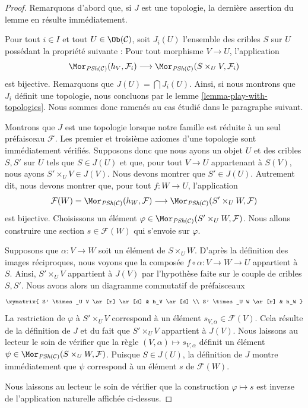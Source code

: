 \begin{proof}
Remarquons d'abord que, si $J$ est une topologie, la dernière assertion du
lemme en résulte immédiatement.

\medskip\noindent
Pour tout $i \in I$ et tout $U \in \Ob(\mathcal{C})$, soit $J_i(U)$
l'ensemble des cribles $S$ sur $U$ possédant la propriété suivante :
Pour tout morphisme $V \to U$, l'application
$$
\Mor_{\textit{PSh}(\mathcal{C})}(h_V, \mathcal{F}_i)
\longrightarrow
\Mor_{\textit{PSh}(\mathcal{C})}(S \times_U V, \mathcal{F}_i)
$$
est bijective. Remarquons que $J(U) = \bigcap J_i(U)$. Ainsi, si nous montrons
que $J_i$ définit une topologie, nous concluons par le
lemme \ref{lemma-play-with-topologies}.
Nous sommes donc ramenés au cas étudié dans le paragraphe suivant.

\medskip\noindent
Montrons que $J$ est une topologie lorsque notre famille est réduite à un seul
préfaisceau $\mathcal{F}$. Les premier et troisième axiomes d'une
topologie sont immédiatement vérifiés. Supposons donc que nous ayons
un objet $U$ et des cribles $S, S'$ sur $U$
tels que $S \in J(U)$ et que, pour tout $V \to U$ appartenant à $S(V)$,
nous ayons $S' \times_U V \in J(V)$. Nous devons montrer que
$S' \in J(U)$. Autrement dit, nous devons montrer que, pour
tout $f : W \to U$, l'application
$$
\mathcal{F}(W) =
\Mor_{\textit{PSh}(\mathcal{C})}(h_W, \mathcal{F})
\longrightarrow
\Mor_{\textit{PSh}(\mathcal{C})}(S' \times_U W, \mathcal{F})
$$
est bijective. Choisissons un élément $\varphi \in
\Mor_{\textit{PSh}(\mathcal{C})}(S' \times_U W, \mathcal{F})$.
Nous allons construire une section $s \in \mathcal{F}(W)$
qui s'envoie sur $\varphi$.

\medskip\noindent
Supposons que $\alpha : V \to W$ soit un élément de $S \times_U W$.
D'après la définition des images réciproques, nous voyons que
la composée $f \circ \alpha : V \to W  \to U$ appartient à $S$. Ainsi,
$S' \times_U V$ appartient à $J(V)$ par l'hypothèse faite sur le couple
de cribles $S, S'$. Nous avons alors un diagramme commutatif
de préfaisceaux
$$
\xymatrix{
S' \times_U V \ar[r] \ar[d] & h_V \ar[d] \\
S' \times_U W \ar[r] & h_W
}
$$
La restriction de $\varphi$ à $S' \times_U V$
correspond à un élément $s_{V, \alpha} \in \mathcal{F}(V)$.
Cela résulte de la définition de $J$
et du fait que $S' \times_U V$ appartient à $J(V)$.
Nous laissons au lecteur le soin de vérifier
que la règle $(V, \alpha) \mapsto s_{V, \alpha}$ définit
un élément
$\psi \in
\Mor_{\textit{PSh}(\mathcal{C})}(S \times_U W, \mathcal{F})$.
Puisque $S \in J(U)$, la définition de $J$ montre immédiatement
que $\psi$ correspond à un élément $s$ de $\mathcal{F}(W)$.

\medskip\noindent
Nous laissons au lecteur le soin de vérifier que la construction
$\varphi \mapsto s$ est inverse de l'application naturelle affichée ci-dessus.
\end{proof}

